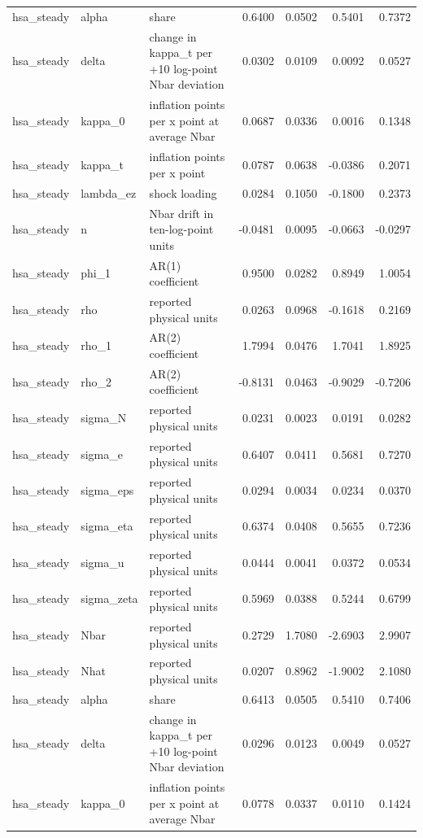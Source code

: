 \begin{tabular}{lllrrrr}
hsa\_steady & alpha & share & 0.6400 & 0.0502 & 0.5401 & 0.7372 \\
hsa\_steady & delta & change in kappa\_t per +10 log-point Nbar deviation & 0.0302 & 0.0109 & 0.0092 & 0.0527 \\
hsa\_steady & kappa\_0 & inflation points per x point at average Nbar & 0.0687 & 0.0336 & 0.0016 & 0.1348 \\
hsa\_steady & kappa\_t & inflation points per x point & 0.0787 & 0.0638 & -0.0386 & 0.2071 \\
hsa\_steady & lambda\_ez & shock loading & 0.0284 & 0.1050 & -0.1800 & 0.2373 \\
hsa\_steady & n & Nbar drift in ten-log-point units & -0.0481 & 0.0095 & -0.0663 & -0.0297 \\
hsa\_steady & phi\_1 & AR(1) coefficient & 0.9500 & 0.0282 & 0.8949 & 1.0054 \\
hsa\_steady & rho & reported physical units & 0.0263 & 0.0968 & -0.1618 & 0.2169 \\
hsa\_steady & rho\_1 & AR(2) coefficient & 1.7994 & 0.0476 & 1.7041 & 1.8925 \\
hsa\_steady & rho\_2 & AR(2) coefficient & -0.8131 & 0.0463 & -0.9029 & -0.7206 \\
hsa\_steady & sigma\_N & reported physical units & 0.0231 & 0.0023 & 0.0191 & 0.0282 \\
hsa\_steady & sigma\_e & reported physical units & 0.6407 & 0.0411 & 0.5681 & 0.7270 \\
hsa\_steady & sigma\_eps & reported physical units & 0.0294 & 0.0034 & 0.0234 & 0.0370 \\
hsa\_steady & sigma\_eta & reported physical units & 0.6374 & 0.0408 & 0.5655 & 0.7236 \\
hsa\_steady & sigma\_u & reported physical units & 0.0444 & 0.0041 & 0.0372 & 0.0534 \\
hsa\_steady & sigma\_zeta & reported physical units & 0.5969 & 0.0388 & 0.5244 & 0.6799 \\
hsa\_steady & Nbar & reported physical units & 0.2729 & 1.7080 & -2.6903 & 2.9907 \\
hsa\_steady & Nhat & reported physical units & 0.0207 & 0.8962 & -1.9002 & 2.1080 \\
hsa\_steady & alpha & share & 0.6413 & 0.0505 & 0.5410 & 0.7406 \\
hsa\_steady & delta & change in kappa\_t per +10 log-point Nbar deviation & 0.0296 & 0.0123 & 0.0049 & 0.0527 \\
hsa\_steady & kappa\_0 & inflation points per x point at average Nbar & 0.0778 & 0.0337 & 0.0110 & 0.1424 \\

\end{tabular}
